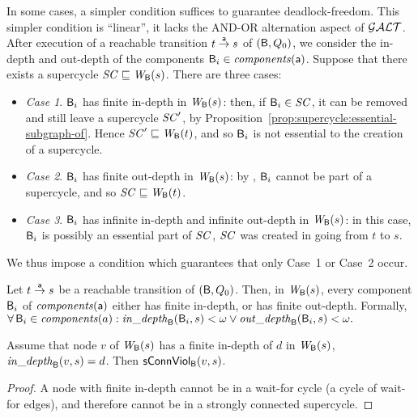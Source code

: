 In some cases, a simpler condition suffices to guarantee deadlock-freedom. This simpler condition is ``linear'', \ie it lacks the AND-OR alternation
aspect of $\GAO$. After execution of a reachable transition $t \goesto[\act] s$ of $(\B, Q_0)$, 
we consider the in-depth and out-depth of the components $\B_i \in \cmps{\act}$. 
Suppose that there exists a supercycle $\SC \subg \wfg{\B}{s}$.
There are three cases:
%
\begin{itemize}

\item \emph{Case 1}. \label{case:finite-in} $\B_i$ has finite in-depth in $\wfg{\B}{s}$: then, if $\B_i \in \SC$, it can be removed and still leave a
  supercycle $\SC'$, by Proposition~\ref{prop:supercycle:essential-subgraph-of}. Hence $\SC' \subg \wfg{\B}{t}$, and so $\B_i$ is not essential
  to the creation of a supercycle.

\item \emph{Case 2}. \label{case:finite-out} $\B_i$ has finite out-depth in $\wfg{\B}{s}$: by , $\B_i$ cannot be
  part of a supercycle, and so $\SC \subg \wfg{\B}{t}$.

\item \emph{Case 3}. \label{case:infinite-both} $\B_i$ has infinite in-depth and infinite out-depth in $\wfg{\B}{s}$: in this case, $\B_i$ is possibly
  an essential part of $\SC$, \ie $\SC$ was created in going from $t$ to $s$.

\end{itemize}
We thus impose a condition which guarantees that only Case~1 or Case~2 occur. 



\begin{definition} \label{def:global:dfc}
Let $t \goesto[\act] s$ be a reachable transition of $(\B, Q_0)$.
Then, in $\wfg{\B}{s}$,  every component $\B_i$ of $\cmps{\act}$ either has finite in-depth, or has finite out-depth.
Formally, \\
\ind  $\fa \B_i \in \cmps{a}: \widepth{\B}{\B_i}{s} < \omega \lor \wodepth{\B}{\B_i}{s} < \omega.$
\end{definition}



\begin{proposition} \label{prop:indepth-finite-implies-scViol}
Assume that node $v$ of $\wfg{\B}{s}$ has a finite in-depth of $d$ in $\wfg{\B}{s}$, \ie 
$\widepth{\B}{v}{s} = d$. Then $\connViol{v}{s}$.
\end{proposition}
%
\begin{proof}
A node with finite in-depth cannot be in a wait-for cycle (\ie a cycle
of wait-for edges), and therefore cannot be in a strongly connected supercycle.
\end{proof}




